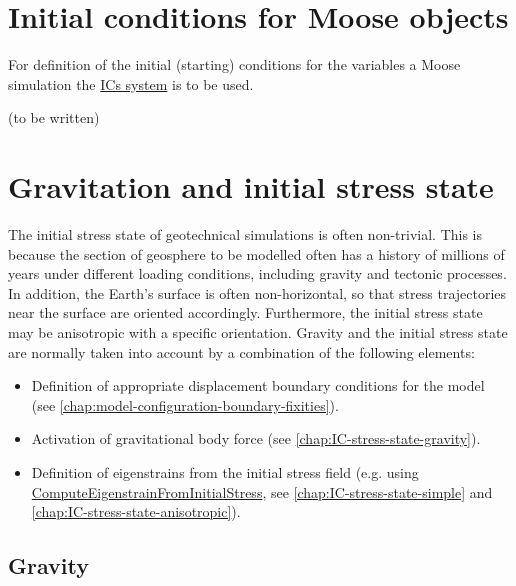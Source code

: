 \section{Initial conditions for Moose objects}
\label{chap:IC-moose-objects}

For definition of the initial (starting) conditions for the variables a Moose
simulation the \href{https://mooseframework.inl.gov/syntax/ICs}{ICs system} is
to be used.

(to be written)

\section{Gravitation and initial stress state}
\label{chap:IC-stress-state}

The initial stress state of geotechnical simulations is often non-trivial. This
is because the section of geosphere to be modelled often has a history of
millions of years under different loading conditions, including gravity and
tectonic processes. In addition, the Earth's surface is often non-horizontal,
so that stress trajectories near the surface are oriented accordingly.
Furthermore, the initial stress state may be anisotropic with a specific
orientation. Gravity and the initial stress state are normally taken into
account by a combination of the following elements:

\begin{itemize}
    \item Definition of appropriate displacement boundary conditions for the model (see
          \autoref{chap:model-configuration-boundary-fixities}).
    \item Activation of gravitational body force (see
          \autoref{chap:IC-stress-state-gravity}).
    \item Definition of eigenstrains from the initial stress field (e.g. using
          \href{https://mooseframework.inl.gov/source/materials/ComputeEigenstrainFromInitialStress.html}{ComputeEigenstrainFromInitialStress},
          see \autoref{chap:IC-stress-state-simple} and
          \autoref{chap:IC-stress-state-anisotropic}).
\end{itemize}


\subsection{Gravity}
\label{chap:IC-stress-state-gravity}

